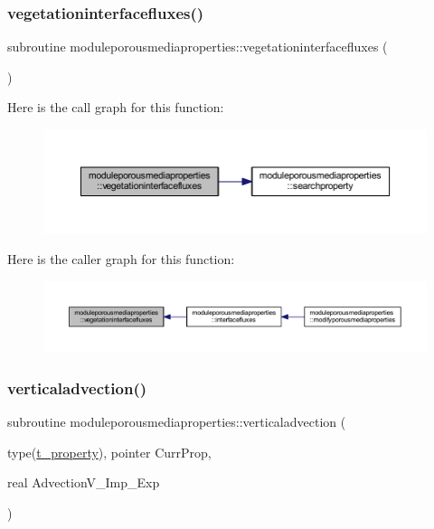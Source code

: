 \subsubsection{\texorpdfstring{vegetationinterfacefluxes()}{vegetationinterfacefluxes()}}
{\footnotesize\ttfamily subroutine moduleporousmediaproperties\+::vegetationinterfacefluxes (\begin{DoxyParamCaption}{ }\end{DoxyParamCaption})\hspace{0.3cm}{\ttfamily [private]}}

Here is the call graph for this function\+:\nopagebreak
\begin{figure}[H]
\begin{center}
\leavevmode
\includegraphics[width=350pt]{namespacemoduleporousmediaproperties_a81fcc32210036b193860971be2aa8f12_cgraph}
\end{center}
\end{figure}
Here is the caller graph for this function\+:\nopagebreak
\begin{figure}[H]
\begin{center}
\leavevmode
\includegraphics[width=350pt]{namespacemoduleporousmediaproperties_a81fcc32210036b193860971be2aa8f12_icgraph}
\end{center}
\end{figure}
\mbox{\label{namespacemoduleporousmediaproperties_a0872f72bfebe157c1a7a7030f27bf43c}} 
\subsubsection{\texorpdfstring{verticaladvection()}{verticaladvection()}}
{\footnotesize\ttfamily subroutine moduleporousmediaproperties\+::verticaladvection (\begin{DoxyParamCaption}\item[{type(\mbox{\hyperlink{structmoduleporousmediaproperties_1_1t__property}{t\+\_\+property}}), pointer}]{Curr\+Prop,  }\item[{real}]{Advection\+V\+\_\+\+Imp\+\_\+\+Exp }\end{DoxyParamCaption})\hspace{0.3cm}{\ttfamily [private]}}

